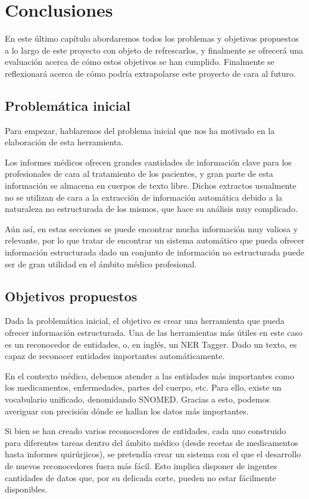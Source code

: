 \chapter{Conclusiones}
En este último capítulo abordaremos todos los problemas y objetivos propuestos a lo largo de este proyecto con objeto de refrescarlos, y finalmente se ofrecerá una evaluación acerca de cómo estos objetivos se han cumplido. Finalmente se reflexionará acerca de cómo podría extrapolarse este proyecto de cara al futuro.

\section{Problemática inicial}
Para empezar, hablaremos del problema inicial que nos ha motivado en la elaboración de esta herramienta.

Los informes médicos ofrecen grandes cantidades de información clave para los profesionales de cara al tratamiento de los pacientes, y gran parte de esta información se almacena en cuerpos de texto libre. Dichos extractos usualmente no se utilizan de cara a la extracción de información automática debido a la naturaleza no estructurada de los mismos, que hace su análisis muy complicado.

Aún así, en estas secciones se puede encontrar mucha información muy valiosa y relevante, por lo que tratar de encontrar un sistema automático que pueda ofrecer información estructurada dado un conjunto de información no estructurada puede ser de gran utilidad en el ámbito médico profesional.

\section{Objetivos propuestos}
Dada la problemática inicial, el objetivo es crear una herramienta que pueda ofrecer información estructurada. Una de las herramientas más útiles en este caso es un reconocedor de entidades, o, en inglés, un NER Tagger. Dado un texto, es capaz de reconocer entidades importantes automáticamente.

En el contexto médico, debemos atender a las entidades más importantes como los medicamentos, enfermedades, partes del cuerpo, etc. Para ello, existe un vocabulario unificado, denomidando SNOMED. Gracias a esto, podemos averiguar con precisión dónde se hallan los datos más importantes.

Si bien se han creado varios reconocedores de entidades, cada uno construido para diferentes tareas dentro del ámbito médico (desde recetas de medicamentos hasta informes quirúrjicos), se pretendía crear un sistema con el que el desarrollo de nuevos reconocedores fuera más fácil. Esto implica disponer de ingentes cantidades de datos que, por su delicada corte, pueden no estar fácilmente disponibles.

